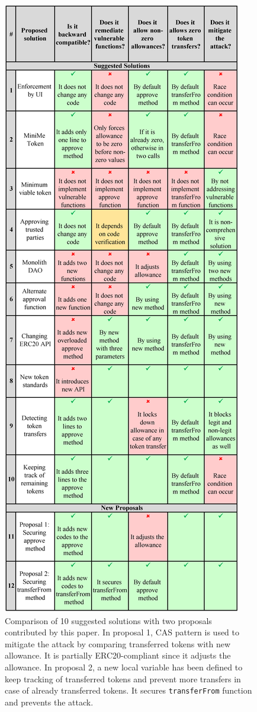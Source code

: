 \begin{figure}[t!]
	\centering
	\includegraphics[width=1.0\linewidth]{figures/multiple_withdrawal_34.png}
	\caption{Comparison of 10 suggested solutions with two proposals contributed by this paper. In proposal 1, CAS pattern is used to mitigate the attack by comparing transferred tokens with new allowance. It is partially ERC20-compliant since it adjusts the allowance. In proposal 2, a new local variable has been defined to keep tracking of transferred tokens and prevent more transfers in case of already transferred tokens. It secures \texttt{transferFrom} function and prevents the attack.\label{tab:comp}}
\end{figure}
